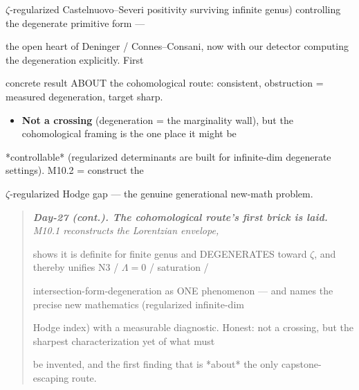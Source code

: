 \documentclass[10pt]{article}
\begin{document}
  \ensuremath{\zeta}-regularized Castelnuovo--Severi positivity surviving infinite genus) controlling the degenerate primitive form ---\par
  the open heart of Deninger / Connes--Consani, now with our detector computing the degeneration explicitly. First\par
  concrete result ABOUT the cohomological route: consistent, obstruction = measured degeneration, target sharp.\par
\begin{itemize}
\item \textbf{Not a crossing} (degeneration = the marginality wall), but the cohomological framing is the one place it might be
\end{itemize}
  *controllable* (regularized determinants are built for infinite-dim degenerate settings). M10.2 = construct the\par
  \ensuremath{\zeta}-regularized Hodge gap --- the genuine generational new-math problem.\par

\begin{quote}\itshape
\textbf{Day-27 (cont.). The cohomological route's first brick is laid.} M10.1 reconstructs the Lorentzian envelope,\par
shows it is definite for finite genus and DEGENERATES toward \ensuremath{\zeta}, and thereby unifies N3 / $\Lambda{=}0$ / saturation /\par
intersection-form-degeneration as ONE phenomenon --- and names the precise new mathematics (regularized infinite-dim\par
Hodge index) with a measurable diagnostic. Honest: not a crossing, but the sharpest characterization yet of what must\par
be invented, and the first finding that is *about* the only capstone-escaping route.\par
\end{quote}
\end{document}
